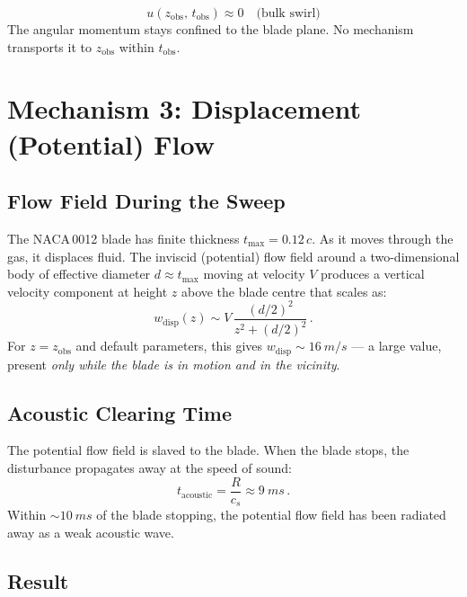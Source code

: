 \documentclass[11pt,a4paper]{article}
\begin{document}
\begin{equation}
  \boxed{u(z_\mathrm{obs},\, t_\mathrm{obs})
    \approx 0 \quad \text{(bulk swirl)}}
\end{equation}
The angular momentum stays confined to the blade plane. No mechanism
transports it to $z_\mathrm{obs}$ within $t_\mathrm{obs}$.


\section{Mechanism 3: Displacement (Potential) Flow}
\label{sec:potential}

\subsection{Flow Field During the Sweep}

The NACA\,0012 blade has finite thickness
$t_\mathrm{max} = 0.12\,c$. As it moves through the gas, it displaces
fluid. The inviscid (potential) flow field around a two-dimensional body
of effective diameter $d \approx t_\mathrm{max}$ moving at velocity $V$
produces a vertical velocity component at height $z$ above the blade
centre that scales as:
\begin{equation}
  w_\mathrm{disp}(z)
    \sim V \,\frac{(d/2)^2}{z^2 + (d/2)^2}\,.
  \label{eq:wdisp}
\end{equation}
For $z = z_\mathrm{obs}$ and default parameters, this gives
$w_\mathrm{disp} \sim \SI{16}{m/s}$ --- a large value, present
\emph{only while the blade is in motion and in the vicinity}.

\subsection{Acoustic Clearing Time}

The potential flow field is slaved to the blade. When the blade stops,
the disturbance propagates away at the speed of sound:
\begin{equation}
  t_\mathrm{acoustic} = \frac{R}{c_s} \approx \SI{9}{ms}\,.
  \label{eq:tacoustic}
\end{equation}
Within $\sim\SI{10}{ms}$ of the blade stopping, the potential flow
field has been radiated away as a weak acoustic wave.

\subsection{Result}
\end{document}
